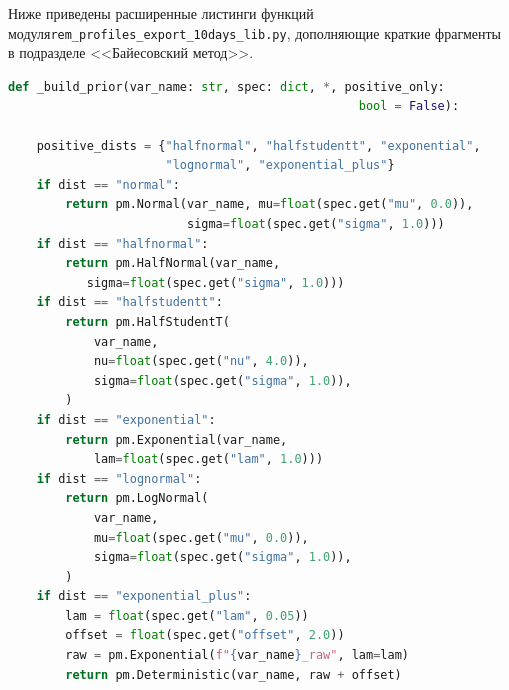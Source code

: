 \documentclass[14pt]{mmcs_article}
\begin{document}
Ниже приведены расширенные листинги функций модуля\linebreak \texttt{rem\_profiles\_export\_10days\_lib.py}, дополняющие краткие фрагменты в подразделе <<Байесовский метод>>.

\begin{lstlisting}[language=Python, caption={Полная реализация \texttt{\_build\_prior}}, label=app-lst:bayes-build-prior-full]
def _build_prior(var_name: str, spec: dict, *, positive_only:
												 bool = False):
    
    positive_dists = {"halfnormal", "halfstudentt", "exponential",
                      "lognormal", "exponential_plus"}
    if dist == "normal":
        return pm.Normal(var_name, mu=float(spec.get("mu", 0.0)),
                         sigma=float(spec.get("sigma", 1.0)))
    if dist == "halfnormal":
        return pm.HalfNormal(var_name,
           sigma=float(spec.get("sigma", 1.0)))
    if dist == "halfstudentt":
        return pm.HalfStudentT(
            var_name,
            nu=float(spec.get("nu", 4.0)),
            sigma=float(spec.get("sigma", 1.0)),
        )
    if dist == "exponential":
        return pm.Exponential(var_name, 
        	lam=float(spec.get("lam", 1.0)))
    if dist == "lognormal":
        return pm.LogNormal(
            var_name,
            mu=float(spec.get("mu", 0.0)),
            sigma=float(spec.get("sigma", 1.0)),
        )
    if dist == "exponential_plus":
        lam = float(spec.get("lam", 0.05))
        offset = float(spec.get("offset", 2.0))
        raw = pm.Exponential(f"{var_name}_raw", lam=lam)
        return pm.Deterministic(var_name, raw + offset)

    
\end{lstlisting}
\end{document}
